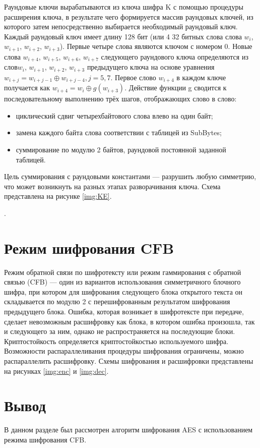 Раундовые ключи вырабатываются из ключа шифра K с помощью процедуры расширения ключа, в результате чего формируется массив раундовых ключей, из которого затем непосредственно выбирается необходимый раундовый ключ. Каждый раундовый ключ имеет длину 128 бит (или 4 32 битных слова слова $w_i$, $w_{i+1}$, $w_{i+2}$, $w_{i+3}$). Первые четыре слова являются ключом с номером 0. Новые слова $w_{i+4}$, $w_{i+5}$, $w_{i+6}$, $w_{i+7}$ следующего раундового ключа определяются из слов$w_i$, $w_{i+1}$, $w_{i+2}$, $w_{i+3}$ предыдущего ключа на основе уравнения $w_{i+j} = w_{i+j-1} \oplus w_{i+j-4}, j=5,7$. Первое слово $w_{i+4}$ в каждом ключе получается как $w_{i+4} = w_{i} \oplus g(w_{i+3})$. Действие функции g сводится к последовательному
выполнению трёх шагов, отображающих слово в слово:
\begin{itemize}[label=---]
	\item циклический сдвиг четырехбайтового слова влево на один байт;
	\item замена каждого байта слова соответствии с таблицей из SubBytes;
	\item суммирование по модулю 2 байтов, раундовой постоянной заданной таблицей.
\end{itemize}
Цель суммирования с раундовыми константами --- разрушить любую симметрию, что может возникнуть на разных этапах разворачивания ключа. Схема представлена на рисунке \ref{img:KE}.

.
\FloatBarrier

\section{Режим шифрования CFB}

Режим обратной связи по шифротексту или режим гаммирования с обратной связью (CFB) --- один из вариантов использования симметричного блочного шифра, при котором для шифрования следующего блока открытого текста он складывается по модулю 2 с перешифрованным результатом шифрования предыдущего блока. Ошибка, которая возникает в шифротексте при передаче, сделает невозможным расшифровку как блока, в котором ошибка произошла, так и следующего за ним, однако не распространяется на последующие блоки. Криптостойкость определяется криптостойкостью используемого шифра. Возможности распараллеливания процедуры шифрования ограничены, можно распараллелить расшифровку. Схемы шифрования и расшифровки представлены на рисунках \ref{img:enc} и \ref{img:dec}.

\FloatBarrier

\section*{Вывод}

В данном разделе был рассмотрен алгоритм шифрования AES с использованием режима шифрования CFB.

